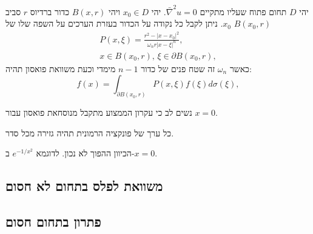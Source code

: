 \documentclass{tstextbook}
\begin{document}
\begin{proposition}
יהי \(D\) תחום פתוח שעליו מתקיים \(\bar{\nabla}^2u=0\). יהי \(x_{0} \in D\) ויהי \(B(x,r)\) כדור ברדיוס \(r\) סביב \(x_{0}\). ניתן לקבל כל נקודה על הכדור בעזרת הערכים על השפה שלו של \(B(x_{0},r)\)$$\begin{array}{c}{{P(x,\xi)=\frac{r^{2}-\left|x-x_{0}\right|^{2}}{\omega_{n}r|x-\xi|^{n}},}}\\ {{x\in B(x_{0},r),\,\xi\in\partial B(x_{0},r),}}\end{array}$$
כאשר \(\omega_{n}\) זה שטח פנים של כדור \(n- 1\) מימדי וכעת משוואת פואסון תהיה:
$$f(x)=\int_{\partial B(x_{0},r)}P(x,\xi)f(\xi)d\sigma(\xi),$$

\end{proposition}
\begin{remark}
נשים לב כי עקרון הממצוע מתקבל מנוסחאת פואסון עבור \(x=0\).

\end{remark}
\begin{proposition}
כל ערך של פונקציה הרמונית תהיה גזירה מכל סדר.

\end{proposition}
\begin{remark}
הכיוון ההפוך לא נכון. לדוגמא \(e^{ -1/x^{2} }\) ב-\(x=0\).

\end{remark}
\subsection{משוואת לפלס בתחום לא חסום}

\subsection{פתרון בתחום חסום}
\end{document}
